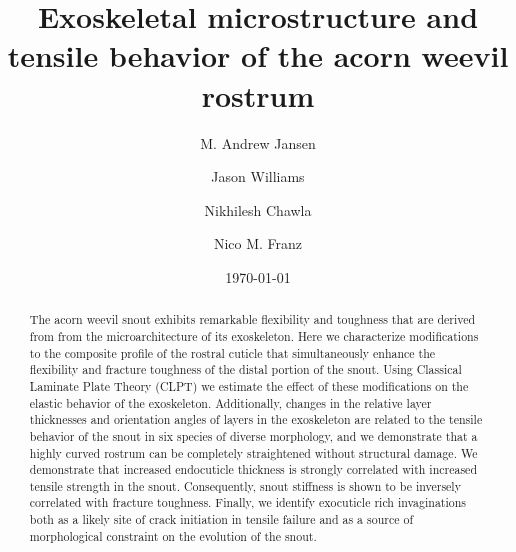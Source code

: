 \documentclass[twocolumn, linenumbers, superscriptaddress, nofootinbib]{revtex4-1}
\begin{document}
	\begin{abstract}
		The acorn weevil snout exhibits remarkable flexibility and toughness that are derived from from the microarchitecture of its exoskeleton.
		Here we characterize modifications to the composite profile of the rostral cuticle that simultaneously enhance the flexibility and fracture toughness of the distal portion of the snout.
		Using Classical Laminate Plate Theory (CLPT) we estimate the effect of these modifications on the elastic behavior of the exoskeleton.
		Additionally, changes in the relative layer thicknesses and orientation angles of layers in the exoskeleton are related to the tensile behavior of the snout in six species of diverse morphology, and we demonstrate that a highly curved rostrum can be completely straightened without structural damage.
		We demonstrate that increased endocuticle thickness is strongly correlated with increased tensile strength in the snout.
		Consequently, snout stiffness is shown to be inversely correlated with fracture toughness.
		Finally, we identify exocuticle rich invaginations both as a likely site of crack initiation in tensile failure and as a source of morphological constraint on the evolution of the snout.
		
	\end{abstract}
	
	{\title{Exoskeletal microstructure and tensile behavior of the acorn weevil rostrum}
	\date{\today}
	
	\author{M. Andrew Jansen}
	\author{Jason Williams}
	\author{Nikhilesh Chawla}
	\author{Nico M. Franz}
		
	\maketitle
	}
\end{document}
